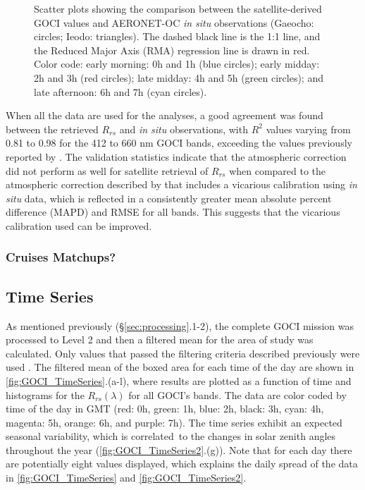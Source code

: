 \documentclass[onecolumn,3p,letterpaper,11pt]{elsarticle}
\begin{document}
\begin{figure}[H]
    \caption{Scatter plots showing the comparison between the satellite-derived GOCI values and AERONET-OC {\it in situ} observations (Gaeocho: circles; Ieodo: triangles). The dashed black line is the 1:1 line, and the Reduced Major Axis (RMA) regression line is drawn in red. Color code: early morning: 0h and 1h (blue circles); early midday: 2h and 3h (red circles); late midday: 4h and 5h (green circles); and late afternoon: 6h and 7h (cyan circles). \label{fig:GOCI_AERO} } 
\end{figure}

When all the data are used for the analyses, a good agreement was found between the retrieved $R_{rs}$ and {\it in situ} observations, with $R^2$ values varying from 0.81 to 0.98 for the 412 to 660 nm GOCI bands, exceeding the values previously reported by \citet{Ahn2015}. The validation statistics indicate that the atmospheric correction did not perform as well for satellite retrieval of $R_{rs}$ when compared to the atmospheric correction described by \citet{Ahn2015} that includes a vicarious calibration using {\it in situ} data, which is reflected in a consistently greater mean absolute percent difference (MAPD) and RMSE for all bands. This suggests that the vicarious calibration used can be improved. 
\subsubsection{Cruises Matchups?}
\subsection{Time Series}
As mentioned previously (\S\ref{sec:processing}.1-2), the complete GOCI mission was processed to Level 2 and then a filtered mean for the area of study was calculated. Only values that passed the filtering criteria described previously were used \citep{Bailey2006}. The filtered mean of the boxed area for each time of the day are shown in \autoref{fig:GOCI_TimeSeries}.(a-l), where results are plotted as a function of time and histograms for the $R_{rs}(\lambda)$ for all GOCI's bands. The data are color coded by time of the day in GMT (red: 0h, green: 1h, blue: 2h, black: 3h, cyan: 4h, magenta: 5h, orange: 6h, and purple: 7h). The time series exhibit an expected seasonal variability, which is correlated~to the changes in solar zenith angles throughout the year (\autoref{fig:GOCI_TimeSeries2}.(g)). Note that for each day there are potentially eight values displayed, which explains the daily spread of the data in \autoref{fig:GOCI_TimeSeries} and \autoref{fig:GOCI_TimeSeries2}. 
\end{document}
